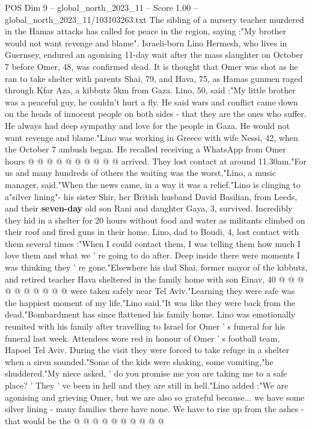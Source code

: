 \begin{textsample}{POS Dim 9 – global\_north\_2023\_11 – Score 1.00 – global\_north\_2023\_11/103103263.txt}  \label{ex:f9_pos_157}
The sibling of a nursery teacher murdered in the Hamas attacks has called for peace in the region, saying :"My brother would not want revenge and blame".
Israeli-born Lino Hermesh, who lives in Guernsey, endured an agonising 11-day wait after the mass slaughter on October 7 before Omer, 48, was confirmed dead.
It is thought that Omer was shot as he ran to take shelter with parents Shai, 79, and Hava, 75, as Hamas gunmen raged through Kfar Aza, a kibbutz 5km from Gaza.
Lino, 50, said :"My little brother was a peaceful guy, he couldn't hurt a fly.
He said wars and conflict came down on the heads of innocent people on both sides - that they are the ones who suffer.
He always had deep sympathy and love for the people in Gaza.
He would not want revenge and blame."Lino was working in Greece with wife Nessi, 42, when the October 7 ambush began.
He recalled receiving a WhatsApp from Omer hours @ @ @ @ @ @ @ @ @ @ arrived.
They lost contact at around 11.30am."For us and many hundreds of others the waiting was the worst,"Lino, a music manager, said."When the news came, in a way it was a relief."Lino is clinging to a"silver lining"- his sister Shir, her British husband David Basilian, from Leeds, and their \textbf{seven-day} old son Rani and daughter Gaya, 3, survived.
Incredibly they hid in a shelter for 20 hours without food and water as militants climbed on their roof and fired guns in their home.
Lino, dad to Boudi, 4, lost contact with them several times :"When I could contact them, I was telling them how much I love them and what we ' re going to do after.
Deep inside there were moments I was thinking they ' re gone."Elsewhere his dad Shai, former mayor of the kibbutz, and retired teacher Hava sheltered in the family home with son Einav, 40 @ @ @ @ @ @ @ @ @ @ were taken safely near Tel Aviv."Learning they were safe was the happiest moment of my life,"Lino said."It was like they were back from the dead."Bombardment has since flattened his family home.
Lino was emotionally reunited with his family after travelling to Israel for Omer ' s funeral for his funeral last week.
Attendees wore red in honour of Omer ' s football team, Hapoel Tel Aviv.
During the visit they were forced to take refuge in a shelter when a siren sounded."Some of the kids were shaking, some vomiting,"he shuddered."My niece asked, ' do you promise me you are taking me to a safe place? ' They ' ve been in hell and they are still in hell."Lino added :"We are agonising and grieving Omer, but we are also so grateful because... we have some silver lining - many families there have none.
We have to rise up from the ashes - that would be the @ @ @ @ @ @ @ @ @ @

\end{textsample}
